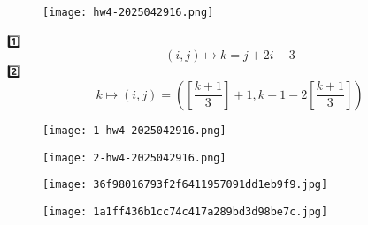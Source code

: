 \begin{exercise}
\begin{figure}[H]
\centering
\texttt{[image: hw4-2025042916.png]}
\label{}
\end{figure}
\end{exercise}
1️⃣
\[
(i,j)\longmapsto k=j+2i-3
\]
2️⃣
\[
k\longmapsto(i,j)=\left( \left[ \frac{k+1}{3} \right]+1,k+1-2\left[ \frac{k+1}{3} \right] \right)
\]
\begin{exercise}
\begin{figure}[H]
\centering
\texttt{[image: 1-hw4-2025042916.png]}
\label{}
\end{figure}
\begin{figure}[H]
\centering
\texttt{[image: 2-hw4-2025042916.png]}
\label{}
\end{figure}
\end{exercise}
\begin{figure}[H]
\centering
\texttt{[image: 36f98016793f2f6411957091dd1eb9f9.jpg]}
\label{}
\end{figure}
\begin{figure}[H]
\centering
\texttt{[image: 1a1ff436b1cc74c417a289bd3d98be7c.jpg]}
\label{}
\end{figure}

